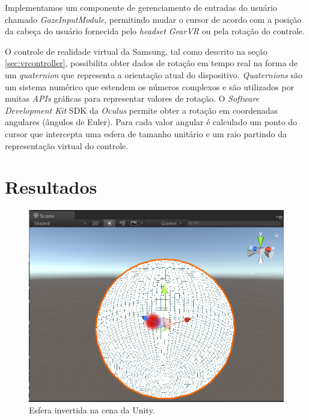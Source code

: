\documentclass[conference]{IEEEtran}
\begin{document}
Implementamos um componente de gerenciamento de entradas do usuário chamado \textit{GazeInputModule}, permitindo mudar o cursor de acordo com a posição da cabeça do usuário fornecida pelo \textit{headset GearVR} ou pela rotação do controle.

O controle de realidade virtual da Samsung, tal como descrito na seção \ref{sec:vrcontroller}, possibilita obter dados de rotação em tempo real \cite{gearvrinputdocs} na forma de um \textit{quaternion} \cite{quaternionhamilton1844ii} que representa a orientação atual do dispositivo. \textit{Quaternions} são um sistema numérico que estendem os números complexos e são utilizados por muitas \textit{APIs} gráficas para representar valores de rotação. O \textit{Software Development Kit} SDK da \textit{Oculus} permite obter a rotação em coordenadas angulares (ângulos de Euler). Para cada valor angular é calculado um ponto do cursor que intercepta uma esfera de tamanho unitário e um raio partindo da representação virtual do controle.

\section{Resultados} \label{sec:results}

\begin{figure}[h!]
\centering
\includegraphics[width=\linewidth]{images/sphere.png}
\caption{Esfera invertida na cena da Unity.}
\label{fig:invertsphere}
\end{figure}
\end{document}
